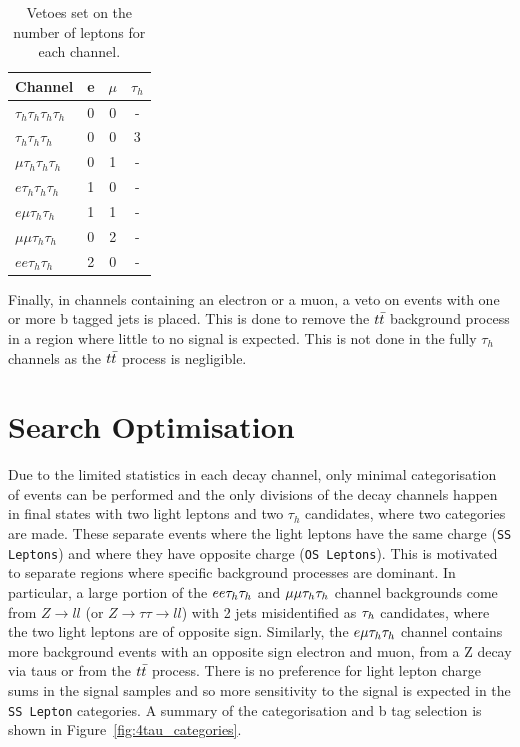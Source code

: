 \begin{table}[H]
   \centering
   \begin{tabular}{|l|c|c|c|}
   \hline
   \multicolumn{1}{|c|}{Channel} & e & $\mu$ & $\tau_h$ \\ \hline \hline
   $\tau_h \tau_h \tau_h \tau_h$ & 0 & 0     & -        \\
   $\tau_h \tau_h \tau_h$        & 0 & 0     & 3        \\ 
   $\mu \tau_h \tau_h \tau_h$    & 0 & 1     & -        \\
   $e \tau_h \tau_h \tau_h$      & 1 & 0     & -        \\
   $e \mu \tau_h \tau_h$         & 1 & 1     & -        \\
   $\mu \mu \tau_h \tau_h$       & 0 & 2     & -        \\
   $e e \tau_h \tau_h$           & 2 & 0     & -        \\ \hline
   \end{tabular}
   \caption{Vetoes set on the number of leptons for each channel.}
   \label{tab:leptonvetoes}
\end{table}

Finally, in channels containing an electron or a muon, a veto on events with one or more b tagged jets is placed.
This is done to remove the $t\bar{t}$ background process in a region where little to no signal is expected.
This is not done in the fully $\tau_h$ channels as the $t\bar{t}$ process is negligible. \\

\section{Search Optimisation}

Due to the limited statistics in each decay channel, only minimal categorisation of events can be performed and the only divisions of the decay channels happen in final states with two light leptons and two $\tau_h$ candidates, where two categories are made.
These separate events where the light leptons have the same charge (\texttt{SS Leptons}) and where they have opposite charge (\texttt{OS Leptons}).
This is motivated to separate regions where specific background processes are dominant.
In particular, a large portion of the $ee\tau_{h}\tau_{h}$ and $\mu\mu\tau_{h}\tau_{h}$ channel backgrounds come from $Z\rightarrow ll$ (or $Z\rightarrow\tau\tau\rightarrow ll$) with 2 jets misidentified as $\tau_{h}$ candidates, where the two light leptons are of opposite sign.
Similarly, the $e\mu\tau_{h}\tau_{h}$ channel contains more background events with an opposite sign electron and muon, from a Z decay via taus or from the $t\bar{t}$ process.
There is no preference for light lepton charge sums in the signal samples and so more sensitivity to the signal is expected in the \texttt{SS Lepton} categories. 
A summary of the categorisation and b tag selection is shown in Figure~\ref{fig:4tau_categories}. \\


